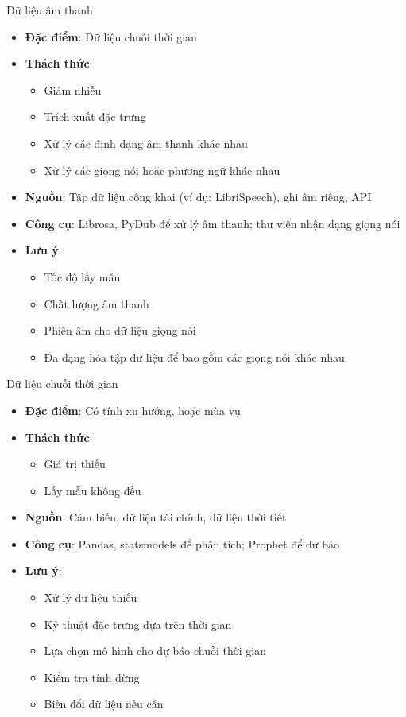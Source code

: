 \documentclass{beamer}
\begin{document}
\begin{frame}{Dữ liệu âm thanh}
    \begin{itemize}
        \item \textbf{Đặc điểm}: Dữ liệu chuỗi thời gian
        \item \textbf{Thách thức}:
        \begin{itemize}
            \item Giảm nhiễu
            \item Trích xuất đặc trưng
            \item Xử lý các định dạng âm thanh khác nhau
            \item Xử lý các giọng nói hoặc phương ngữ khác nhau
        \end{itemize}
        \item \textbf{Nguồn}: Tập dữ liệu công khai (ví dụ: LibriSpeech), ghi âm riêng, API
        \item \textbf{Công cụ}: Librosa, PyDub để xử lý âm thanh; thư viện nhận dạng giọng nói
        \item \textbf{Lưu ý}:
        \begin{itemize}
            \item Tốc độ lấy mẫu
            \item Chất lượng âm thanh
            \item Phiên âm cho dữ liệu giọng nói
            \item Đa dạng hóa tập dữ liệu để bao gồm các giọng nói khác nhau
        \end{itemize}
    \end{itemize}
\end{frame}

\begin{frame}{Dữ liệu chuỗi thời gian}
    \begin{itemize}
        \item \textbf{Đặc điểm}: Có tính xu hướng, hoặc mùa vụ
        \item \textbf{Thách thức}:
        \begin{itemize}
            \item Giá trị thiếu
            \item Lấy mẫu không đều
        \end{itemize}
        \item \textbf{Nguồn}: Cảm biến, dữ liệu tài chính, dữ liệu thời tiết
        \item \textbf{Công cụ}: Pandas, statsmodels để phân tích; Prophet để dự báo
        \item \textbf{Lưu ý}:
        \begin{itemize}
            \item Xử lý dữ liệu thiếu
            \item Kỹ thuật đặc trưng dựa trên thời gian
            \item Lựa chọn mô hình cho dự báo chuỗi thời gian
            \item Kiểm tra tính dừng
            \item Biến đổi dữ liệu nếu cần
        \end{itemize}
    \end{itemize}
\end{frame}
\end{document}
